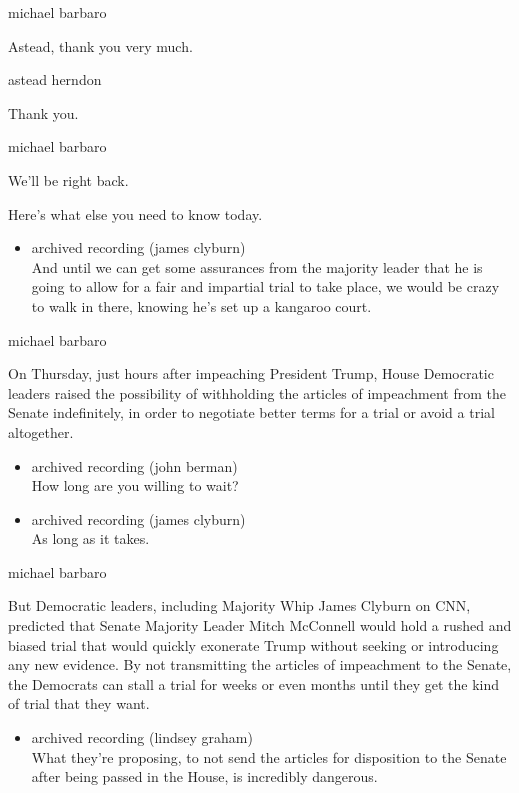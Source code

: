 michael barbaro

Astead, thank you very much.

astead herndon

Thank you.

michael barbaro

We'll be right back.

Here's what else you need to know today.

\begin{itemize}
\tightlist
\item
  archived recording (james clyburn)\\
  And until we can get some assurances from the majority leader that he
  is going to allow for a fair and impartial trial to take place, we
  would be crazy to walk in there, knowing he's set up a kangaroo court.
\end{itemize}

michael barbaro

On Thursday, just hours after impeaching President Trump, House
Democratic leaders raised the possibility of withholding the articles of
impeachment from the Senate indefinitely, in order to negotiate better
terms for a trial or avoid a trial altogether.

\begin{itemize}
\item
  archived recording (john berman)\\
  How long are you willing to wait?
\item
  archived recording (james clyburn)\\
  As long as it takes.
\end{itemize}

michael barbaro

But Democratic leaders, including Majority Whip James Clyburn on CNN,
predicted that Senate Majority Leader Mitch McConnell would hold a
rushed and biased trial that would quickly exonerate Trump without
seeking or introducing any new evidence. By not transmitting the
articles of impeachment to the Senate, the Democrats can stall a trial
for weeks or even months until they get the kind of trial that they
want.

\begin{itemize}
\tightlist
\item
  archived recording (lindsey graham)\\
  What they're proposing, to not send the articles for disposition to
  the Senate after being passed in the House, is incredibly dangerous.
\end{itemize}

